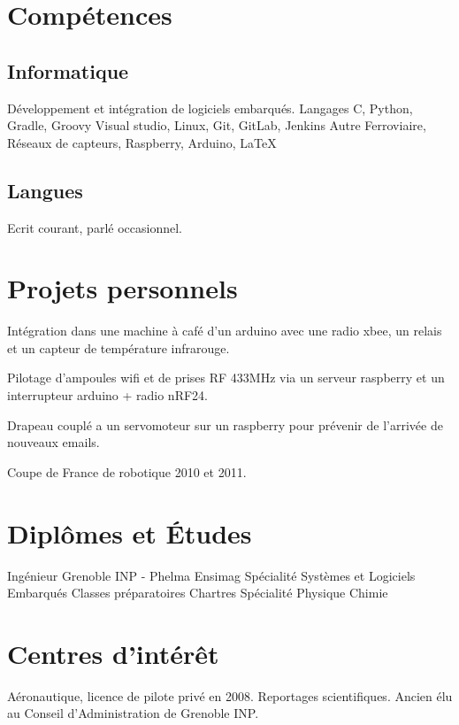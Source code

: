 \documentclass[10pt,a4paper]{moderncv}
\begin{document}
\section{Compétences}

  \subsection{Informatique}

    {\small Développement et intégration de logiciels embarqués.\newline{}}
    {Langages}
    {\small C, Python, Gradle, Groovy}
    {\small Visual studio, Linux, Git, GitLab, Jenkins\newline{}}
    {Autre}
    {\small Ferroviaire, Réseaux de capteurs, Raspberry, Arduino, \LaTeX} 

  \subsection{Langues}

    {\small Ecrit courant, parlé occasionnel.\newline{}}

\section{Projets personnels}
  {\small Intégration dans une machine à café d'un arduino avec une radio xbee, un relais et un capteur de température infrarouge.}
  
  {\small Pilotage d'ampoules wifi et de prises RF 433MHz via un serveur raspberry et un interrupteur arduino + radio nRF24.}
  
  {\small Drapeau couplé a un servomoteur sur un raspberry pour prévenir de l'arrivée de nouveaux emails.\newline{}}
  
  {\small Coupe de France de robotique 2010 et 2011.}

\section{Diplômes et Études}
  {Ingénieur Grenoble INP - Phelma Ensimag}
  {}
  {}
  {}
  {Spécialité Systèmes et Logiciels Embarqués\newline{}}
  {Classes préparatoires}
  {}
  {}
  {Chartres}
  {Spécialité Physique Chimie\newline{}}

\section{Centres d'intérêt}
  {\small Aéronautique, licence de pilote privé en 2008.}
  \cvline{}
  {\small Reportages scientifiques.}
  \cvline{}
  {\small Ancien élu au Conseil d'Administration de Grenoble INP.}
\end{document}
